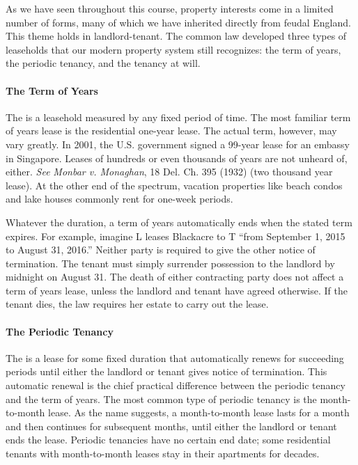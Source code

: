 As we have seen throughout this course, property interests come in a limited
number of forms, many of which we have inherited directly from feudal England. 
This theme holds in landlord-tenant.  The common law developed three types of
leaseholds that our modern property system still recognizes: the term of years,
the periodic tenancy, and the tenancy at will.

\paragraph{The Term of Years}

The  is a leasehold measured by any fixed period of time. 
The most familiar term of years lease is the residential one-year lease. The
actual term, however, may vary greatly.  In 2001, the U.S. government signed a
99-year lease for an embassy in Singapore.  Leases of hundreds or even
thousands of years are not unheard of, either.  \textit{See} \emph{Monbar v.
Monaghan}, 18 Del. Ch. 395 (1932) (two thousand year lease).  At the other end
of the spectrum, vacation properties like beach condos and lake houses commonly
rent for one-week periods. 

Whatever the duration, a term of years automatically ends when the stated term
expires.  For example, imagine L leases Blackacre to T ``from September 1, 2015
to August 31, 2016.''  Neither party is required to give the other notice of
termination.  The tenant must simply surrender possession to the landlord by
midnight on August 31.  The death of either contracting party does not affect a
term of years lease, unless the landlord and tenant have agreed otherwise.  If
the tenant dies, the law requires her estate to carry out the lease. 

\paragraph{The Periodic Tenancy}

The  is a lease for some fixed duration that
automatically renews for succeeding periods until either the landlord or tenant
gives notice of termination.  This automatic renewal is the chief practical
difference between the periodic tenancy and the term of years.  The most common
type of periodic tenancy is the month-to-month lease.  As the name suggests, a
month-to-month lease lasts for a month and then continues for subsequent
months, until either the landlord or tenant ends the lease.  Periodic tenancies
have no certain end date; some residential tenants with month-to-month leases
stay in their apartments for decades.  

